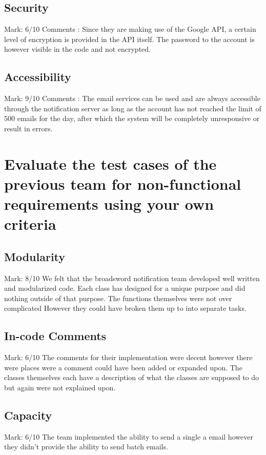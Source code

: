 \documentclass[11pt]{article}
\begin{document}
	\subsection{Security}
		Mark: 6/10
		Comments : Since they are making use of the Google API, a certain level of encryption is provided in the API itself. The password to the account is however visible in the code and not encrypted. 
		

	\subsection{Accessibility}
		Mark: 9/10
		Comments : The email services can be used and are always accessible through the notification server as long as the account has not reached the limit of 500 emails for the day, after which the system will be completely unresponsive or result in errors.
		

\section{Evaluate the test cases of the previous team for non-functional requirements using your own criteria}	
	\subsection{Modularity}
		Mark: 8/10
		We felt that the broadsword notification team developed well written and modularized code. Each class has designed for a unique purpose and did nothing outside of that purpose. The functions themselves were not over complicated However they could have broken them up to into separate tasks.
		
	\subsection{In-code Comments}
		Mark: 6/10 
		The comments for their implementation were decent however there were places were a comment could have been added or expanded upon. The classes themselves each have a description of what the classes are supposed to do but again were not explained upon.
		
	\subsection{Capacity}
		Mark: 6/10
		The team implemented the ability to send a single a email however they didn't provide the ability to send batch emails.
		
\end{document}
